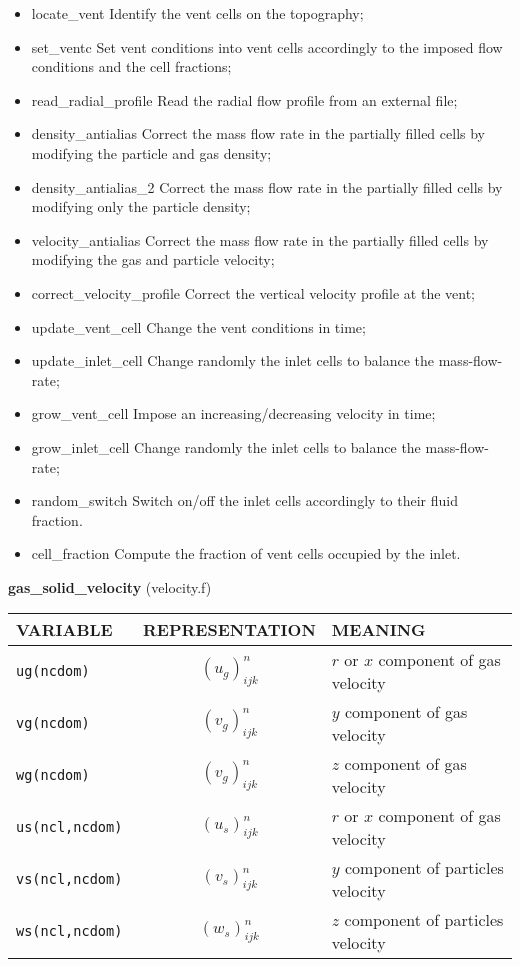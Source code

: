 \begin{itemize}
\item {locate\_vent} Identify the vent cells on the topography;
\item {set\_ventc} Set vent conditions into vent cells accordingly to the imposed flow conditions and the cell fractions;
\item {read\_radial\_profile} Read the radial flow profile from an external file;
\item {density\_antialias} Correct the mass flow rate in the partially filled cells by modifying the particle and gas density;
\item {density\_antialias\_2} Correct the mass flow rate in the partially filled cells by modifying only the particle density;
\item {velocity\_antialias} Correct the mass flow rate in the partially filled cells by modifying the gas and particle velocity;
\item {correct\_velocity\_profile} Correct the vertical velocity profile at the vent;
\item {update\_vent\_cell} Change the vent conditions in time;
\item {update\_inlet\_cell} Change randomly the inlet cells to balance the mass-flow-rate;
\item {grow\_vent\_cell} Impose an increasing/decreasing velocity in time;
\item {grow\_inlet\_cell} Change randomly the inlet cells to balance the mass-flow-rate;
\item {random\_switch} Switch on/off the inlet cells accordingly to their fluid fraction.
\item {cell\_fraction} Compute the fraction of vent cells occupied by the inlet.
\end{itemize}
%
%
{\large {\bf gas\_solid\_velocity}} (velocity.f)\\[5mm]
\begin{tabular}{|p{6cm}|c|p{6cm}|}\hline
VARIABLE & REPRESENTATION & MEANING\\\hline
\tt ug(ncdom) & $(u_g)^n_{ijk}$ &   $r$ or $x$ component of gas velocity\\\hline
\tt vg(ncdom) & $(v_g)^n_{ijk}$ &  $y$ component of gas velocity\\\hline
\tt wg(ncdom) & $(v_g)^n_{ijk}$ &  $z$ component of gas velocity\\\hline
\tt us(ncl,ncdom) & $(u_s)^n_{ijk}$ &   $r$ or $x$ component of gas velocity\\\hline
\tt vs(ncl,ncdom) & $(v_s)^n_{ijk}$ &  $y$ component of particles velocity\\\hline
\tt ws(ncl,ncdom) & $(w_s)^n_{ijk}$ &  $z$ component of particles velocity\\\hline
\end{tabular}\\[5mm]
